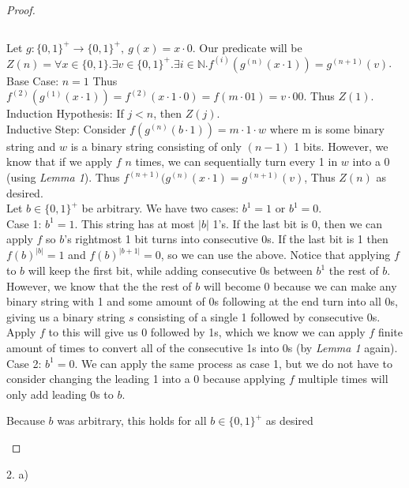 \documentclass[11pt]{article}
\newcommand{\N}{\mathbb{N}}
\newenvironment{myproof}
{\begin{proof} \begin{adjustwidth}{3em}{0pt}$ $\par\nobreak\ignorespaces}
{\end{adjustwidth} \end{proof}}
\begin{document}
\begin{flushleft}
\begin{myproof}
Let $g: \{ 0, 1 \}^+ \to \{ 0, 1 \}^+, \ g(x) = x \cdot 0$. Our predicate will be $Z(n) = \forall x \in \{ 0, 1 \}. \exists v \in \{ 0, 1 \}^+. \exists i \in \N$.$f^{(i)}(g^{(n)}(x \cdot 1)) = g^{(n+1)}(v)$. \\
\bigskip
Base Case: $n = 1$ Thus $f^{(2)}(g^{(1)}(x \cdot 1)) = f^{(2)}(x \cdot 1 \cdot 0) =  f(m \cdot 01) = v \cdot 00$. Thus $Z(1)$. \\
\bigskip
Induction Hypothesis: If $j < n$, then $Z(j)$. \\
\bigskip
Inductive Step: Consider $f(g^{(n)}(b \cdot 1)) = m \cdot 1 \cdot w$ where m is some binary string and $w$ is a binary string consisting of only $(n-1)$ 1 bits. However, we know that if we apply $f$ $n$ times, we can sequentially turn every 1 in $w$ into a 0 (using \textit{Lemma 1}). Thus $f^{(n+1)}(g^{(n)}(x \cdot 1) = g^{(n+1)}(v)$, Thus $Z(n)$ as desired. \\
\bigskip
Let $b \in \{ 0 , 1 \}^+$ be arbitrary. We have two cases: $b^1 = 1$ or $b^1 = 0$. \\
\bigskip
Case 1: $b^1  = 1$. This string has at most $|b|$ 1's. If the last bit is 0, then we can apply $f$ so $b$'s rightmost 1 bit turns into consecutive 0s. If the last bit is 1 then $f(b)^{|b|} = 1$ and $f(b)^{|b+1|} = 0$, so we can use the above. Notice that applying $f$ to $b$ will keep the first bit, while adding consecutive 0s between $b^1$ the rest of $b$. However, we know that the the rest of $b$ will become 0 because we can make any binary string with 1 and some amount of 0s following at the end turn into all 0s, giving us a binary string $s$ consisting of a single 1 followed by consecutive 0s. Apply $f$ to this will give us 0 followed by 1s, which we know we can apply $f$ finite amount of times to convert all of the consecutive 1s into 0s (by \textit{Lemma 1} again). \\
\bigskip
Case 2: $b^1 = 0$. We can apply the same process as case 1, but we do not have to consider changing the leading 1 into a 0 because applying $f$ multiple times will only add leading 0s to $b$.

Because $b$ was arbitrary, this holds for all $b \in \{ 0, 1 \}^+$ as desired
\end{myproof}

\newpage

2. a)


\end{flushleft}
\end{document}

